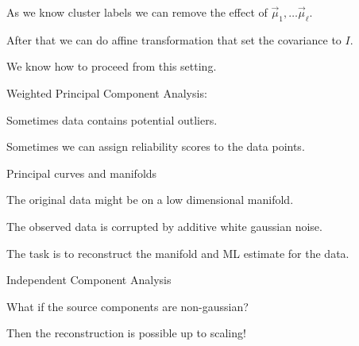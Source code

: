 \documentclass[landscape,footrule]{foils}
\begin{document}


\begin{triangles}
\item As we know cluster labels we can remove the effect of $\vec{\mu}_1,\ldots\vec{\mu}_\ell$.
\item After that we can do affine transformation that set the covariance to $I$.
\item We know how to proceed from this setting.  
\end{triangles}





Weighted Principal Component Analysis:
\begin{triangles}
\item Sometimes data contains potential outliers.
\item Sometimes we can assign reliability scores to the data points. 
\end{triangles}\vspace*{1.0cm}

Principal curves and manifolds
\begin{triangles}
\item The original data might be on a low dimensional manifold. 
\item The observed data is corrupted by additive white gaussian noise. 
\item The task is to reconstruct the manifold and ML estimate for the data. 
\end{triangles}\vspace*{1.0cm}


Independent Component Analysis 
\begin{triangles}
\item What if the source components are non-gaussian? 
\item Then the reconstruction is possible up to scaling!
\end{triangles} 


\end{document}
